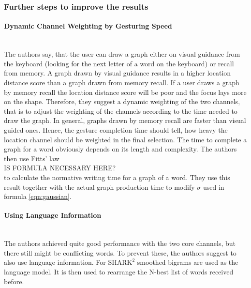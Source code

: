 \subsubsection{Further steps to improve the results}
\paragraph{Dynamic Channel Weighting by Gesturing Speed}\ \\
The authors say, that the user can draw a graph either on visual guidance from the keyboard (looking for the next letter of a word on the keyboard) or recall from memory. A graph drawn by visual guidance results in a higher location distance score than a graph drawn from memory recall. If a user draws a graph by memory recall the location distance score will be poor and the focus lays more on the shape. Therefore, they suggest a dynamic weighting of the two channels, that is to adjust the weighting of the channels according to the time needed to draw the graph. In general, graphs drawn by memory recall are faster than visual guided ones. Hence, the gesture completion time should tell, how heavy the location channel should be weighted in the final selection. The time to complete a graph for a word obviously depends on its length and complexity. The authors then use Fitts' law\\
IS FORMULA NECESSARY HERE?\\
to calculate the normative writing time for a graph of a word. They use this result together with the actual graph production time to modify $\sigma$ used in formula \ref{eqn:gaussian}.\\
\paragraph{Using Language Information}\ \\
The authors achieved quite good performance with the two core channels, but there still might be conflicting words. To prevent these, the authors suggest to also use language information. For $\text{SHARK}^2$ smoothed bigrams are used as the language model. It is then used to rearrange the N-best list of words received before.